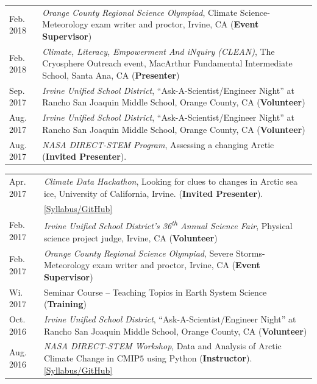 \documentclass[margin,line,palatino,courier,10pt]{res}
\begin{document}
\begin{resume}
\begin{tabular}{@{}p{0.9in}p{4in}}
Feb. 2018 & \textit{Orange County Regional Science Olympiad}, Climate Science-Meteorology exam writer and proctor, Irvine, CA (\textbf{Event Supervisor})\\
Feb. 2018 & \textit{Climate, Literacy, Empowerment And iNquiry (CLEAN)}, The Cryosphere Outreach event, MacArthur Fundamental Intermediate School, Santa Ana, CA (\textbf{Presenter})\\
Sep. 2017 & \textit{Irvine Unified School District}, ``Ask-A-Scientist/Engineer Night'' at Rancho San Joaquin Middle School, Orange County, CA (\textbf{Volunteer})\\
Aug. 2017 & \textit{Irvine Unified School District}, ``Ask-A-Scientist/Engineer Night'' at Rancho San Joaquin Middle School, Orange County, CA (\textbf{Volunteer})\\
Aug. 2017 & \textit{NASA DIRECT-STEM Program}, Assessing a changing Arctic (\textbf{Invited Presenter}).\\
\end{tabular}
\begin{tabular}{@{}p{0.9in}p{4in}}
Apr. 2017 & \textit{Climate Data Hackathon}, Looking for clues to changes in Arctic 
sea ice, University of California, Irvine. (\textbf{Invited Presenter}).\\ & \href{https://github.com/UCIDataScienceInitiative/Climate_Hackathon}{[Syllabus/GitHub]}\\
Feb. 2017 & \textit{Irvine Unified School District's 36\textsuperscript{th} Annual Science Fair}, Physical science project judge, Irvine, CA (\textbf{Volunteer})\\
Feb. 2017 & \textit{Orange County Regional Science Olympiad}, Severe Storms-Meteorology exam writer and proctor, Irvine, CA (\textbf{Event Supervisor})\\
Wi. 2017 & Seminar Course -- Teaching Topics in Earth System Science (\textbf{Training})\\
Oct. 2016 & \textit{Irvine Unified School District}, ``Ask-A-Scientist/Engineer Night'' at Rancho San Joaquin Middle School, Orange County, CA (\textbf{Volunteer})\\
Aug. 2016 & \textit{NASA DIRECT-STEM Workshop}, Data and Analysis of Arctic Climate Change in CMIP$5$ using Python (\textbf{Instructor}). \href{https://github.com/strongh/DIRECT-STEM-climate-workshop}{[Syllabus/GitHub]}\\
\end{tabular}

\noindent\textcolor{Cerulean}{\makebox[\linewidth][r]{\rule{\textwidth}{5pt}}}

\end{resume}
\end{document}
